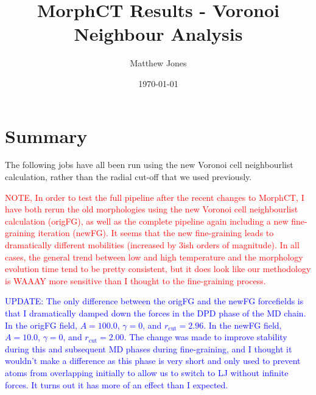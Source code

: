 \documentclass[12pt]{article}
\title{MorphCT Results - Voronoi Neighbour Analysis}
\author{Matthew Jones}
\date{\today}
\begin{document}
\maketitle

\section{Summary}

The following jobs have all been run using the new Voronoi cell neighbourlist calculation, rather than the radial cut-off that we used previously.

\textcolor{red}{NOTE, In order to test the full pipeline after the recent changes to MorphCT, I have both rerun the old morphologies using the new Voronoi cell neighbourlist calculation (origFG), as well as the complete pipeline again including a new fine-graining iteration (newFG).
It seems that the new fine-graining leads to dramatically different mobilities (increased by 3ish orders of magnitude).
In all cases, the general trend between low and high temperature and the morphology evolution time tend to be pretty consistent, but it does look like our methodology is WAAAY more sensitive than I thought to the fine-graining process.
}

\textcolor{blue}{UPDATE: The only difference between the origFG and the newFG forcefields is that I dramatically damped down the forces in the DPD phase of the MD chain.
    In the origFG field, $A = 100.0$, $\gamma = 0$, and $r_{\text{cut}} = 2.96$.
    In the newFG field, $A = 10.0$, $\gamma = 0$, and $r_{\text{cut}} = 2.00$.
    The change was made to improve stability during this and subsequent MD phases during fine-graining, and I thought it wouldn't make a difference as this phase is very short and only used to prevent atoms from overlapping initially to allow us to switch to LJ without infinite forces.
It turns out it has more of an effect than I expected.}
\end{document}
